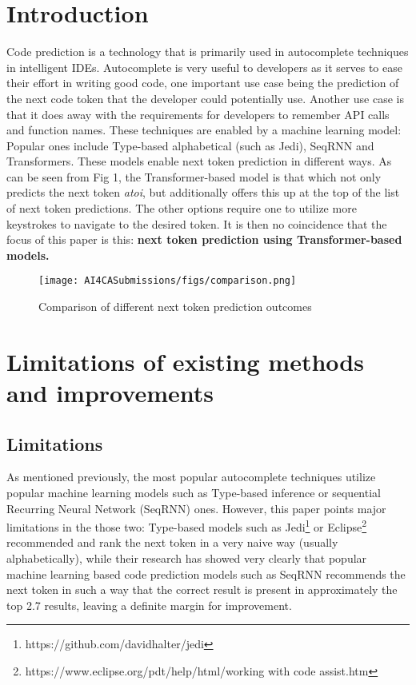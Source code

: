 \documentclass[sigplan,screen,9pt]{acmart}
\begin{document}
\section{Introduction}
Code prediction is a technology that is primarily used in autocomplete techniques in intelligent IDEs. Autocomplete is very useful to developers as it serves to ease their effort in writing good code, one important use case being the prediction of the next code token that the developer could potentially use. Another use case is that it does away with the requirements for developers to remember API calls and function names.\cite{FeedTree} 
\newline
These techniques are enabled by a machine learning model: Popular ones include Type-based alphabetical (such as Jedi\cite{Jedi}), SeqRNN\cite{seqRNN} and Transformers. These models enable next token prediction in different ways. As can be seen from Fig 1\cite{FeedTree}, the Transformer-based model is that which not only predicts the next token \textit{atoi}, but additionally offers this up at the top of the list of next token predictions. The other options require one to utilize more keystrokes to navigate to the desired token. It is then no coincidence that the focus of this paper is this: \textbf{next token prediction using Transformer-based models.}
\begin{figure}[h]
  \centering
  \texttt{[image: AI4CASubmissions/figs/comparison.png]}
  \caption{Comparison of different next token prediction outcomes}
\end{figure}
\newline
\section{Limitations of existing methods and improvements}
\subsection{Limitations}
As mentioned previously, the most popular autocomplete techniques utilize popular machine learning models such as Type-based inference or sequential Recurring Neural Network (SeqRNN) ones. However, this paper points major limitations in the those two: Type-based models such as Jedi\footnote{https://github.com/davidhalter/jedi} or Eclipse\footnote{https://www.eclipse.org/pdt/help/html/working with code assist.htm} recommended and rank the next token in a very naive way (usually alphabetically), while their research has showed very clearly that popular machine learning based code prediction models such as SeqRNN recommends the next token in such a way that the correct result is present in approximately the top 2.7 results, leaving a definite margin for improvement.\cite{FeedTree}
\end{document}
